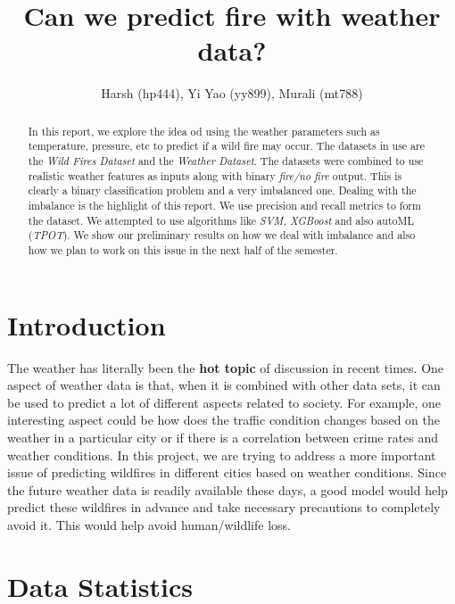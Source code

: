 \documentclass[10pt]{article}
\begin{document}
\title{\bf Can we predict fire with weather data?}
\author{Harsh (hp444), Yi Yao (yy899), Murali (mt788)}
\maketitle

\begin{abstract}
In this report, we explore the idea od using the weather parameters such as
temperature, pressure, etc to predict if a wild fire may occur. The datasets in
use are the \textit{Wild Fires Dataset} and the \textit{Weather Dataset}.
The datasets were combined to use realistic weather features as inputs along
with binary \textit{fire/no fire} output. This is clearly a binary
classification problem and a very imbalanced one. Dealing with the imbalance is
the highlight of this report. We use precision and recall metrics to form the
dataset. We attempted to use algorithms like \textit{SVM, XGBoost} and also
autoML (\textit{TPOT}). We show our preliminary results on how we deal with
imbalance and also how we plan to work on this issue in the next half of the
semester.\par
\end{abstract}

\section{Introduction}

The weather has literally been the \textbf{hot topic} of discussion in recent
times. One aspect of weather data is that, when it is combined with other data
sets, it can be used to predict a lot of different aspects related to society.
For example, one interesting aspect could be how does the traffic condition
changes based on the weather in a particular city or if there is a correlation
between crime rates and weather conditions. In this project, we are trying to
address a more important issue of predicting wildfires in different cities
based on weather conditions. Since the future weather data is readily available
these days, a good model would help predict these wildfires in advance and take
necessary precautions to completely avoid it. This would help avoid
human/wildlife loss.\par

\section{Data Statistics}
\end{document}
